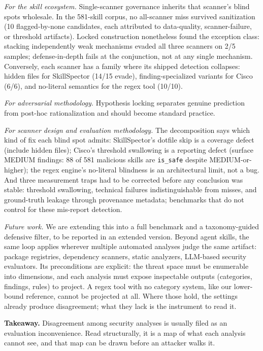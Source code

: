 \documentclass[sigconf,nonacm]{acmart}
\begin{document}
\emph{For the skill ecosystem.} Single-scanner governance inherits that scanner's blind spots wholesale. In the 581-skill corpus, no all-scanner miss survived sanitization (10 flagged-by-none candidates, each attributed to data-quality, scanner-failure, or threshold artifacts). Locked construction nonetheless found the exception class: stacking independently weak mechanisms evaded all three scanners on 2/5 samples; defense-in-depth fails at the conjunction, not at any single mechanism. Conversely, each scanner has a family where its shipped detection collapses: hidden files for SkillSpector (14/15 evade), finding-specialized variants for Cisco (6/6), and no-literal semantics for the regex tool (10/10).

\emph{For adversarial methodology.} Hypothesis locking separates genuine prediction from post-hoc rationalization and should become standard practice.

\emph{For scanner design and evaluation methodology.} The decomposition says which kind of fix each blind spot admits: SkillSpector's dotfile skip is a coverage defect (include hidden files); Cisco's threshold swallowing is a reporting defect (surface MEDIUM findings: 88 of 581 malicious skills are \texttt{is\_safe} despite MEDIUM-or-higher); the regex engine's no-literal blindness is an architectural limit, not a bug. And three measurement traps had to be corrected before any conclusion was stable: threshold swallowing, technical failures indistinguishable from misses, and ground-truth leakage through provenance metadata; benchmarks that do not control for these mis-report detection.

\emph{Future work.} We are extending this into a full benchmark and a taxonomy-guided defensive filter, to be reported in an extended version. Beyond agent skills, the same loop applies wherever multiple automated analyses judge the same artifact: package registries, dependency scanners, static analyzers, LLM-based security evaluators. Its preconditions are explicit: the threat space must be enumerable into dimensions, and each analysis must expose inspectable outputs (categories, findings, rules) to project. A regex tool with no category system, like our lower-bound reference, cannot be projected at all. Where those hold, the settings already produce disagreement; what they lack is the instrument to read it.

\vspace{\medskipamount}
\noindent\textbf{Takeaway.} Disagreement among security analyses is usually filed as an evaluation inconvenience. Read structurally, it is a map of what each analysis cannot see, and that map can be drawn before an attacker walks it.
\end{document}
